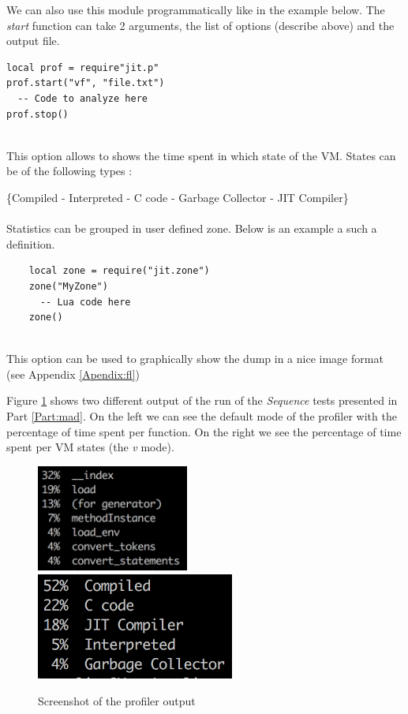 We can also use this module programmatically like in the example below. The
\emph{start} function can take 2 arguments, the list of options (describe above)
and the output file.
\begin{lstlisting}[style=LuaStyle]
local prof = require"jit.p"
prof.start("vf", "file.txt")
  -- Code to analyze here
prof.stop()
\end{lstlisting}

\\
This option allows to shows the time spent in which state of the VM.
States can be of the following types :

\{Compiled - Interpreted - C code - Garbage Collector - JIT Compiler\} \\

\\
Statistics can be grouped in user defined zone. Below is an example a such a
definition.
\begin{lstlisting}
    local zone = require("jit.zone")
    zone("MyZone")
      -- Lua code here
    zone()
\end{lstlisting}

\\
This option can be used to graphically show the dump in a nice image format
(see Appendix \ref{Apendix:fl})

Figure \ref{fig:profiler} shows two different output of the run of the
\emph{Sequence} tests presented in Part \ref{Part:mad}. On the left we can see
the default mode of the profiler with the percentage of time spent per function.
On the right we see the percentage of time spent per VM states (the \emph{v} mode).

\begin{figure}[H]
    \centering
    \includegraphics[height=3.5cm]{./Images/profiler-1}
    \includegraphics[height=3.5cm]{./Images/profiler-2}
    \caption{Screenshot of the profiler output}
    \label{fig:profiler}
\end{figure}
